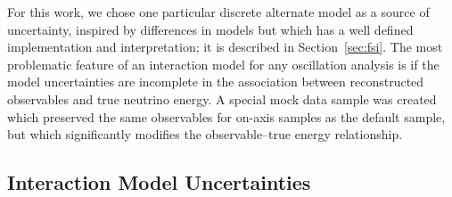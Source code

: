 
For this work, we chose one particular discrete alternate model as a source of uncertainty, inspired by differences in models but which has a well defined implementation and interpretation; it is described in Section~\ref{sec:fsi}. The most problematic feature of an interaction model for any oscillation analysis is if the model uncertainties are incomplete in the association between reconstructed observables and true neutrino energy. A special mock data sample was created which preserved the same observables for on-axis samples as the default sample, but which significantly modifies the observable--true energy relationship.


\subsection{Interaction Model Uncertainties}


